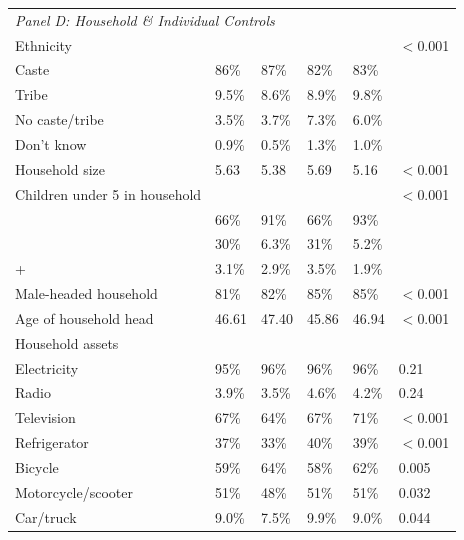 \documentclass{article}        %
\begin{document}
\begin{landscape}
\begin{longtable}{@{}p{6cm}p{2.5cm}p{2.5cm}p{2.5cm}p{2.5cm}p{1.5cm}@{}}
\multicolumn{6}{l}{\textit{Panel D: Household \& Individual Controls}} \\[2pt]

\quad Ethnicity                              &        &        &        &        & $<$0.001 \\
\quad\quad Caste                             & 86\%   & 87\%   & 82\%   & 83\%   &          \\
\quad\quad Tribe                             & 9.5\%  & 8.6\%  & 8.9\%  & 9.8\%  &          \\
\quad\quad No caste/tribe                    & 3.5\%  & 3.7\%  & 7.3\%  & 6.0\%  &          \\
\quad\quad Don't know                        & 0.9\%  & 0.5\%  & 1.3\%  & 1.0\%  &          \\[4pt]

\quad Household size                         & 5.63   & 5.38   & 5.69   & 5.16   & $<$0.001 \\
\quad Children under 5 in household         &        &        &        &        & $<$0.001 \\
\quad\quad 0                                 & 66\%   & 91\%   & 66\%   & 93\%   &          \\
\quad\quad 1                                 & 30\%   & 6.3\%  & 31\%   & 5.2\%  &          \\
\quad\quad 2+                                & 3.1\%  & 2.9\%  & 3.5\%  & 1.9\%  &          \\[4pt]

\quad Male-headed household                  & 81\%   & 82\%   & 85\%   & 85\%   & $<$0.001 \\
\quad Age of household head                  & 46.61  & 47.40  & 45.86  & 46.94  & $<$0.001 \\[4pt]

\quad Household assets                       &        &        &        &        &          \\
\quad\quad Electricity                       & 95\%   & 96\%   & 96\%   & 96\%   & 0.21     \\
\quad\quad Radio                             & 3.9\%  & 3.5\%  & 4.6\%  & 4.2\%  & 0.24     \\
\quad\quad Television                        & 67\%   & 64\%   & 67\%   & 71\%   & $<$0.001 \\
\quad\quad Refrigerator                      & 37\%   & 33\%   & 40\%   & 39\%   & $<$0.001 \\
\quad\quad Bicycle                           & 59\%   & 64\%   & 58\%   & 62\%   & 0.005    \\
\quad\quad Motorcycle/scooter                & 51\%   & 48\%   & 51\%   & 51\%   & 0.032    \\
\quad\quad Car/truck                         & 9.0\%  & 7.5\%  & 9.9\%  & 9.0\%  & 0.044    \\[4pt]


\end{longtable}
\end{landscape}
\end{document}
